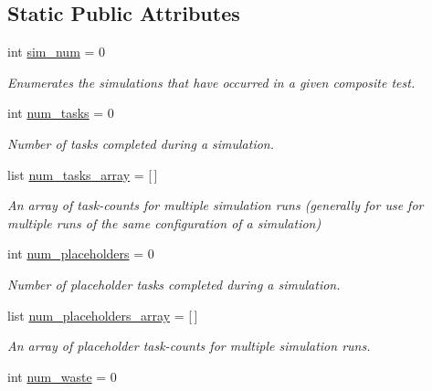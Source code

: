 \subsection*{Static Public Attributes}
\begin{DoxyCompactItemize}
\item 
int \hyperlink{classdynamicfilterapp_1_1test__simulations_1_1_simulation_test_a85a91fb88baf5a119ab7c5cddf9006ae}{sim\+\_\+num} = 0
\begin{DoxyCompactList}\small\item\em Enumerates the simulations that have occurred in a given composite test. \end{DoxyCompactList}\item 
int \hyperlink{classdynamicfilterapp_1_1test__simulations_1_1_simulation_test_acabb76141a8e1b125551bab4cc352cf3}{num\+\_\+tasks} = 0
\begin{DoxyCompactList}\small\item\em Number of tasks completed during a simulation. \end{DoxyCompactList}\item 
list \hyperlink{classdynamicfilterapp_1_1test__simulations_1_1_simulation_test_a9a711b14b6afd224c385343d7b1d2c28}{num\+\_\+tasks\+\_\+array} = \mbox{[}$\,$\mbox{]}
\begin{DoxyCompactList}\small\item\em An array of task-\/counts for multiple simulation runs (generally for use for multiple runs of the same configuration of a simulation) \end{DoxyCompactList}\item 
int \hyperlink{classdynamicfilterapp_1_1test__simulations_1_1_simulation_test_ae67ea06fd676feeaac67e3d95c5649d3}{num\+\_\+placeholders} = 0
\begin{DoxyCompactList}\small\item\em Number of placeholder tasks completed during a simulation. \end{DoxyCompactList}\item 
list \hyperlink{classdynamicfilterapp_1_1test__simulations_1_1_simulation_test_a55d26b5f7261b447d97cf30b9714808c}{num\+\_\+placeholders\+\_\+array} = \mbox{[}$\,$\mbox{]}
\begin{DoxyCompactList}\small\item\em An array of placeholder task-\/counts for multiple simulation runs. \end{DoxyCompactList}\item 
int \hyperlink{classdynamicfilterapp_1_1test__simulations_1_1_simulation_test_a6a47bd243e0af8b779e6639e880eb81c}{num\+\_\+waste} = 0

\end{DoxyCompactItemize}
